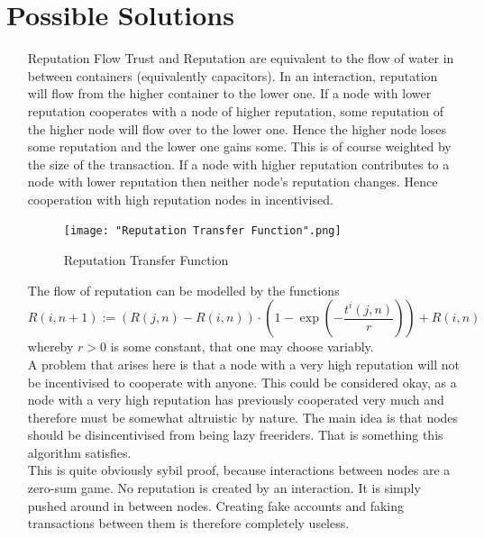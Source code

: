 \documentclass[11pt,a4paper]{report}
\theoremstyle{definition}
\theoremstyle{theorem}
\theoremstyle{proposition}
\theoremstyle{corollary}
\theoremstyle{lemma}
\theoremstyle{example}
\theoremstyle{remark}
\begin{document}
\section{Possible Solutions}
\label{sec:Possible Solutions}
\begin{enumerate}
\item[Reputation Flow] Trust and Reputation are equivalent to the flow of water in between containers (equivalently capacitors). In an interaction, reputation will flow from the higher container to the lower one. If a node with lower reputation cooperates with a node of higher reputation, some reputation of the higher node will flow over to the lower one. Hence the higher node loses some reputation and the lower one gains some. This is of course weighted by the size of the transaction. If a node with higher reputation contributes to a node with lower reputation then neither node's reputation changes. Hence cooperation with high reputation nodes in incentivised. \vspace{1em}\\

\begin{figure}
\begin{center}
\texttt{[image: "Reputation Transfer Function".png]}
\caption{Reputation Transfer Function}
\label{fig:Reputation Transfer Function}
\end{center}
\end{figure}
\noindent{}The flow of reputation can be modelled by the functions
\[
R(i,n+1):=(R(j,n)-R(i,n))\cdot\left(1-\exp(-\frac{t^i(j,n)}{r})\right)+R(i,n)
\]
whereby $r>0$ is some constant, that one may choose variably. \vspace{1em}\\

\noindent{}A problem that arises here is that a node with a very high reputation will not be incentivised to cooperate with anyone. This could be considered okay, as a node with a very high reputation has previously cooperated very much and therefore must be somewhat altruistic by nature. The main idea is that nodes should be disincentivised from being lazy freeriders. That is something this algorithm satisfies. \vspace{1em}\\

\noindent{}This is quite obviously sybil proof, because interactions between nodes are a zero-sum game. No reputation is created by an interaction. It is simply pushed around in between nodes. Creating fake accounts and faking transactions between them is therefore completely useless.\vspace{1em}\\


\end{enumerate}
\end{document}
